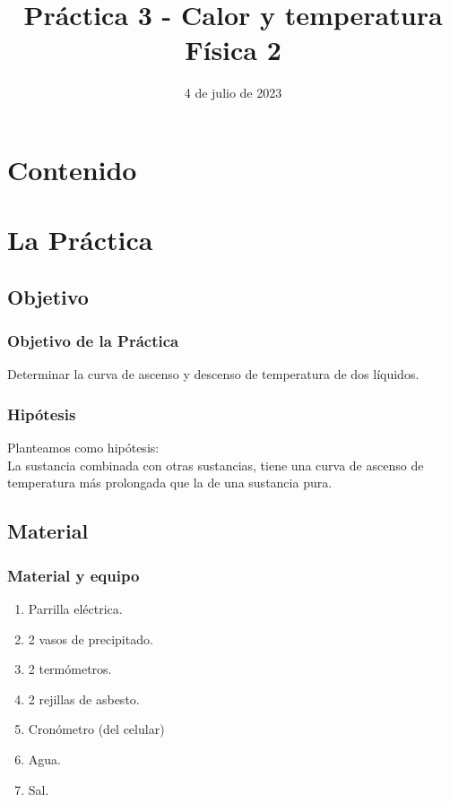 \documentclass[14pt]{beamer}
\title{\Large{Práctica 3 - Calor y temperatura} \\ \normalsize{Física 2}}
\date{4 de julio de 2023}
\begin{document}
\maketitle

\section*{Contenido}

\section{La Práctica}
\subsection{Objetivo}

\begin{frame}
\frametitle{Objetivo de la Práctica}
Determinar la curva de ascenso y descenso de temperatura de dos líquidos.
\end{frame}
\begin{frame}
\frametitle{Hipótesis}
Planteamos como hipótesis:
\\
\pause
La sustancia combinada con otras sustancias, tiene una curva de ascenso de temperatura más prolongada que la de una sustancia pura.
\end{frame}

\subsection{Material}

\begin{frame}
\frametitle{Material y equipo}
\begin{enumerate}[<+->]
\item Parrilla eléctrica.
\item 2 vasos de precipitado.
\item 2 termómetros.
\item 2 rejillas de asbesto.
\item Cronómetro (del celular)
\item Agua.
\item Sal.
\end{enumerate}
\end{frame}
\end{document}
